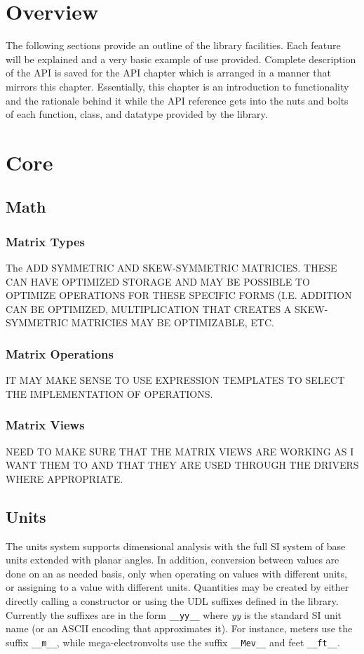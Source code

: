 \documentclass[10pt,letterpaper]{memoir} %
\begin{document}
\section{Overview}
The following sections provide an outline of the library facilities.  Each feature will be explained and a very basic example of use provided.  Complete description of the API is saved for the API chapter which is arranged in a manner that mirrors this chapter.  Essentially, this chapter is an introduction to functionality and the rationale behind it while the API reference gets into the nuts and bolts of each function, class, and datatype provided by the library.

\section{Core}
\subsection{Math}
\subsubsection{Matrix Types}
The 
ADD SYMMETRIC AND SKEW-SYMMETRIC MATRICIES.  THESE CAN HAVE OPTIMIZED STORAGE AND MAY BE POSSIBLE TO OPTIMIZE OPERATIONS FOR THESE SPECIFIC FORMS (I.E. ADDITION CAN BE OPTIMIZED, MULTIPLICATION THAT CREATES A SKEW-SYMMETRIC MATRICIES MAY BE OPTIMIZABLE, ETC.

\subsubsection{Matrix Operations}
IT MAY MAKE SENSE TO USE EXPRESSION TEMPLATES TO SELECT THE IMPLEMENTATION OF OPERATIONS.

\subsubsection{Matrix Views}
NEED TO MAKE SURE THAT THE MATRIX VIEWS ARE WORKING AS I WANT THEM TO AND THAT THEY ARE USED THROUGH THE DRIVERS WHERE APPROPRIATE.

\subsection{Units}
The units system supports dimensional analysis with the full SI system of base units extended with planar angles.  In addition, conversion between values are done on an as needed basis, only when operating on values with different units, or assigning to a value with different units.  Quantities may be created by either directly calling a constructor or using the UDL suffixes defined in the library.  Currently the suffixes are in the form \texttt{__yy__} where \emph{yy} is the standard SI unit name (or an ASCII encoding that approximates it).  For instance, meters use the suffix \texttt{__m__}, while mega-electronvolts use the suffix \texttt{__Mev__} and feet \texttt{__ft__}.
\end{document}
